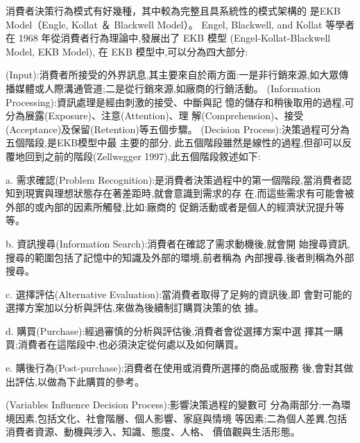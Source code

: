消費者決策行為模式有好幾種，其中較為完整且具系統性的模式架構的
是EKB Model（Engle, Kollat ＆ Blackwell Model）。
Engel, Blackwell, and Kollat 等學者在 1968 年從消費者行為理論中,發展出了 EKB 模型 (Engel-Kollat-Blackwell Model, EKB Model),
在 EKB 模型中,可以分為四大部分:
\begin{enumerate}
(Input):消費者所接受的外界訊息,其主要來自於兩方面:一是非行銷來源,如大眾傳播媒體或人際溝通管道;二是從行銷來源,如廠商的行銷活動。
(Information Processing):資訊處理是經由刺激的接受、中斷與記
憶的儲存和稍後取用的過程,可分為展露(Exposure)、注意(Attention)、理
解(Comprehension)、接受(Acceptance)及保留(Retention)等五個步驟。
(Decision Process):決策過程可分為五個階段,是EKB模型中最 主要的部分,
此五個階段雖然是線性的過程,但卻可以反覆地回到之前的階段(Zellwegger 1997),此五個階段敘述如下:

a. 需求確認(Problem Recognition):是消費者決策過程中的第一個階段,當消費者認知到現實與理想狀態存在著差距時,就會意識到需求的存 在,而這些需求有可能會被外部的或內部的因素所觸發,比如:廠商的 促銷活動或者是個人的經濟狀況提升等等。

b. 資訊搜尋(Information Search):消費者在確認了需求動機後,就會開 始搜尋資訊,搜尋的範圍包括了記憶中的知識及外部的環境,前者稱為 內部搜尋,後者則稱為外部搜尋。

c. 選擇評估(Alternative Evaluation):當消費者取得了足夠的資訊後,即 會對可能的選擇方案加以分析與評估,來做為後續制訂購買決策的依 據。

d. 購買(Purchase):經過審慎的分析與評估後,消費者會從選擇方案中選 擇其一購買;消費者在這階段中,也必須決定從何處以及如何購買。

e. 購後行為(Post-purchase):消費者在使用或消費所選擇的商品或服務 後,會對其做出評估,以做為下此購買的參考。

(Variables Influence Decision Process):影響決策過程的變數可 分為兩部分:一為環境因素,包括文化、社會階層、個人影響、家庭與情境 等因素;二為個人差異,包括消費者資源、動機與涉入、知識、態度、人格、 價值觀與生活形態。
\end{enumerate}



